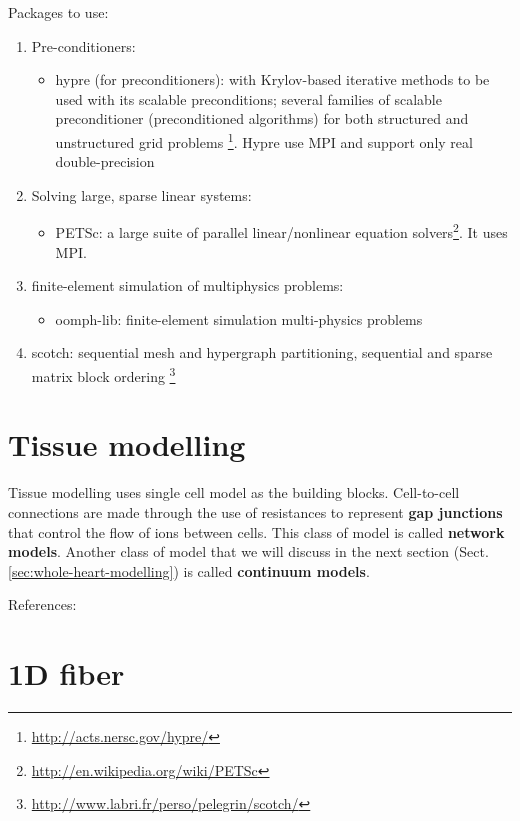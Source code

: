 Packages to use:
\begin{enumerate}
  \item Pre-conditioners:
  \begin{itemize}
      \item hypre (for preconditioners): with Krylov-based iterative methods to be
  used with its scalable preconditions; several families of scalable preconditioner (preconditioned
  algorithms) for both structured and unstructured grid problems
  \footnote{\url{http://acts.nersc.gov/hypre/}}. Hypre use MPI and support only
  real double-precision 
    
  \end{itemize}
  \item Solving large, sparse linear systems:
  \begin{itemize}
  \item PETSc: a large suite of parallel linear/nonlinear equation
  solvers\footnote{\url{http://en.wikipedia.org/wiki/PETSc}}. It uses MPI. 
  \end{itemize}
  \item finite-element simulation of multiphysics problems:
  \begin{itemize}
     \item oomph-lib: finite-element simulation multi-physics problems 
  \end{itemize}
  \item scotch:
  sequential mesh and
  hypergraph
  partitioning,
  sequential and
  sparse matrix block
  ordering \footnote{\url{http://www.labri.fr/perso/pelegrin/scotch/}}
\end{enumerate}

\section{Tissue modelling}
\label{sec:tissue-modelling}

Tissue modelling uses single cell model as the building blocks. Cell-to-cell
connections are made through the use of resistances to represent {\bf gap
junctions} that control the flow of ions between cells. This class of model is
called {\bf network models}. Another class of model that we will discuss in the
next section (Sect.\ref{sec:whole-heart-modelling}) is called {\bf continuum
models}. 

References: \citep{capelle1980, leon1991, trayanova1996, rudy2000}

\section{1D fiber}

